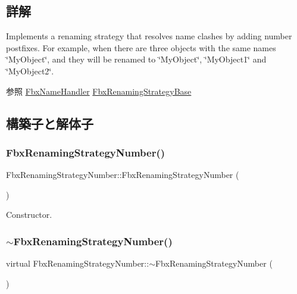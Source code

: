 \subsection{詳解}
Implements a renaming strategy that resolves name clashes by adding number postfixes. For example, when there are three objects with the same names \char`\"{}\+My\+Object\char`\"{}, and they will be renamed to \char`\"{}\+My\+Object\char`\"{}, \char`\"{}\+My\+Object1\char`\"{} and \char`\"{}\+My\+Object2\char`\"{}.

\begin{DoxySeeAlso}{参照}
\hyperlink{class_fbx_name_handler}{Fbx\+Name\+Handler} \hyperlink{class_fbx_renaming_strategy_base}{Fbx\+Renaming\+Strategy\+Base} 
\end{DoxySeeAlso}


\subsection{構築子と解体子}
\mbox{\label{class_fbx_renaming_strategy_number_a804b86f501a15158ce4c8b6b065e682d}} 
\subsubsection{\texorpdfstring{Fbx\+Renaming\+Strategy\+Number()}{FbxRenamingStrategyNumber()}}
{\footnotesize\ttfamily Fbx\+Renaming\+Strategy\+Number\+::\+Fbx\+Renaming\+Strategy\+Number (\begin{DoxyParamCaption}{ }\end{DoxyParamCaption})}



Constructor. 

\mbox{\label{class_fbx_renaming_strategy_number_a1ad543ecf2a3fe15324dd01f69c35ac1}} 
\subsubsection{\texorpdfstring{$\sim$\+Fbx\+Renaming\+Strategy\+Number()}{~FbxRenamingStrategyNumber()}}
{\footnotesize\ttfamily virtual Fbx\+Renaming\+Strategy\+Number\+::$\sim$\+Fbx\+Renaming\+Strategy\+Number (\begin{DoxyParamCaption}{ }\end{DoxyParamCaption})\hspace{0.3cm}{\ttfamily [virtual]}}




